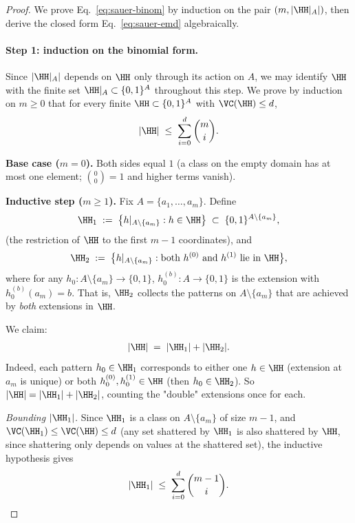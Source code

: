 \begin{proof}
We prove Eq.~\eqref{eq:sauer-binom} by induction on the pair $(m, |\HH|_A|)$, then derive the closed form Eq.~\eqref{eq:sauer-emd} algebraically.

\paragraph{Step 1: induction on the binomial form.}
Since $|\HH|_A|$ depends on $\HH$ only through its action on $A$, we may identify $\HH$ with the finite set $\HH|_A \subset \{0,1\}^A$ throughout this step. We prove by induction on $m \ge 0$ that for every finite $\HH \subset \{0,1\}^A$ with $\VC(\HH) \le d$,
\begin{align*}
|\HH| \;\le\; \sum_{i=0}^{d} \binom{m}{i}.
\end{align*}

\textbf{Base case ($m = 0$).} Both sides equal $1$ (a class on the empty domain has at most one element; $\binom{0}{0} = 1$ and higher terms vanish).

\textbf{Inductive step ($m \ge 1$).} Fix $A = \{a_1, \ldots, a_m\}$. Define
\begin{align*}
\HH_1 \;:=\; \bigl\{ h|_{A \setminus \{a_m\}} : h \in \HH \bigr\} \;\subset\; \{0,1\}^{A \setminus \{a_m\}},
\end{align*}
(the restriction of $\HH$ to the first $m - 1$ coordinates), and
\begin{align*}
\HH_2 \;:=\; \bigl\{ h|_{A \setminus \{a_m\}} : \text{both } h^{(0)} \text{ and } h^{(1)} \text{ lie in } \HH \bigr\},
\end{align*}
where for any $h_0: A \setminus \{a_m\} \to \{0,1\}$, $h_0^{(b)}: A \to \{0,1\}$ is the extension with $h_0^{(b)}(a_m) = b$. That is, $\HH_2$ collects the patterns on $A \setminus \{a_m\}$ that are achieved by \emph{both} extensions in $\HH$.

We claim:
\begin{align}\label{eq:sauer-decomp}
|\HH| \;=\; |\HH_1| + |\HH_2|.
\end{align}
Indeed, each pattern $h_0 \in \HH_1$ corresponds to either one $h \in \HH$ (extension at $a_m$ is unique) or both $h_0^{(0)}, h_0^{(1)} \in \HH$ (then $h_0 \in \HH_2$). So $|\HH| = |\HH_1| + |\HH_2|$, counting the "double" extensions once for each.

\emph{Bounding $|\HH_1|$.} Since $\HH_1$ is a class on $A \setminus \{a_m\}$ of size $m - 1$, and $\VC(\HH_1) \le \VC(\HH) \le d$ (any set shattered by $\HH_1$ is also shattered by $\HH$, since shattering only depends on values at the shattered set), the inductive hypothesis gives
\begin{align*}
|\HH_1| \;\le\; \sum_{i=0}^{d} \binom{m-1}{i}.
\end{align*}


\end{proof}
